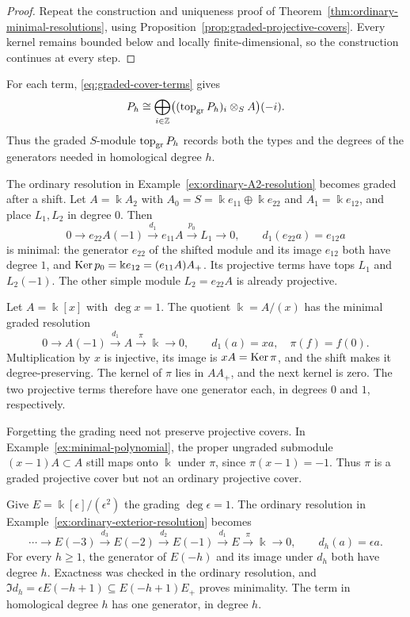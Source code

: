 \begin{proof}
Repeat the construction and uniqueness proof of Theorem~\ref{thm:ordinary-minimal-resolutions}, using Proposition~\ref{prop:graded-projective-covers}.
Every kernel remains bounded below and locally finite-dimensional, so the construction continues at every step.
\end{proof}

For each term, \eqref{eq:graded-cover-terms} gives
\[
P_h\cong\bigoplus_{i\in\mathbb{Z}}\bigl((\operatorname{top}\nolimits_{\mathrm{gr}} P_h)_i\otimes_S A\bigr)(-i).
\]
Thus the graded $S$-module $\operatorname{top}\nolimits_{\mathrm{gr}} P_h$ records both the types and the degrees of the generators needed in homological degree $h$.


\begin{example}\label{ex:minimal-A2}
The ordinary resolution in Example~\ref{ex:ordinary-A2-resolution} becomes graded after a shift.
Let $A=\Bbbk A_2$ with $A_0=S=\Bbbk e_{11}\oplus\Bbbk e_{22}$ and $A_1=\Bbbk e_{12}$, and place $L_1,L_2$ in degree $0$.
Then
\[
0\longrightarrow e_{22}A(-1)\xrightarrow{d_1}e_{11}A
\xrightarrow{p_0}L_1\longrightarrow0,\qquad
d_1(e_{22}a)=e_{12}a
\]
is minimal: the generator $e_{22}$ of the shifted module and its image $e_{12}$ both have degree $1$, and $\operatorname{Ker}\nolimits p_0=\Bbbk e_{12}=(e_{11}A)A_+$.
Its projective terms have tops $L_1$ and $L_2(-1)$.
The other simple module $L_2=e_{22}A$ is already projective.
\end{example}

\begin{example}\label{ex:minimal-polynomial}
Let $A=\Bbbk[x]$ with $\deg x=1$.
The quotient $\Bbbk=A/(x)$ has the minimal graded resolution
\[
0\longrightarrow A(-1)\xrightarrow{d_1}A\xrightarrow{\pi}\Bbbk
\longrightarrow0,\qquad d_1(a)=xa,\quad\pi(f)=f(0).
\]
Multiplication by $x$ is injective, its image is $xA=\operatorname{Ker}\nolimits\pi$, and the shift makes it degree-preserving.
The kernel of $\pi$ lies in $AA_+$, and the next kernel is zero.
The two projective terms therefore have one generator each, in degrees $0$ and $1$, respectively.
\end{example}

\begin{supplementary}
Forgetting the grading need not preserve projective covers.
In Example~\ref{ex:minimal-polynomial}, the proper ungraded submodule $(x-1)A\subset A$ still maps onto $\Bbbk$ under $\pi$, since $\pi(x-1)=-1$.
Thus $\pi$ is a graded projective cover but not an ordinary projective cover.
\end{supplementary}

\begin{example}\label{ex:minimal-exterior}
Give $E=\Bbbk[\epsilon]/(\epsilon^2)$ the grading $\deg\epsilon=1$.
The ordinary resolution in Example~\ref{ex:ordinary-exterior-resolution} becomes
\[
\cdots\longrightarrow E(-3)\xrightarrow{d_3}E(-2)
\xrightarrow{d_2}E(-1)\xrightarrow{d_1}E\xrightarrow{\pi}\Bbbk
\longrightarrow0,
\qquad d_h(a)=\epsilon a.
\]
For every $h\geq1$, the generator of $E(-h)$ and its image under $d_h$ both have degree $h$.
Exactness was checked in the ordinary resolution, and $\Im d_h=\epsilon E(-h+1)\subseteq E(-h+1)E_+$ proves minimality.
The term in homological degree $h$ has one generator, in degree $h$.
\end{example}


